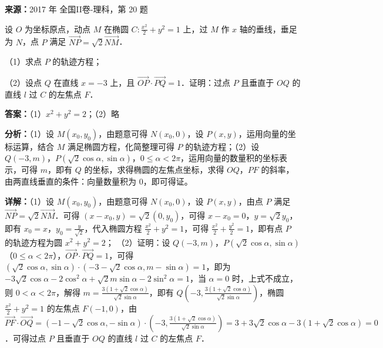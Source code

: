 \begin{question}[points=12]
\textbf{来源：}2017 年 全国II卷-理科，第 20 题\par
设 $O$ 为坐标原点，动点 $M$ 在椭圆 $C:\frac{x^2}{2}+y^2=1$ 上，过 $M$ 作 $x$ 轴的垂线，垂足为 $N$，点 $P$ 满足 $\overrightarrow{NP}=\sqrt{2}\overrightarrow{NM}$．

（1）求点 $P$ 的轨迹方程；

（2）设点 $Q$ 在直线 $x=-3$ 上，且 $\overrightarrow{OP}\cdot\overrightarrow{PQ}=1$．证明：过点 $P$ 且垂直于 $OQ$ 的直线 $l$ 过 $C$ 的左焦点 $F$．
\begin{solution}
\textbf{答案：}（1）$x^2+y^2=2$；（2）略

\textbf{分析：}（1）设 $M(x_0,y_0)$，由题意可得 $N(x_0,0)$，设 $P(x,y)$，运用向量的坐标运算，结合 $M$ 满足椭圆方程，化简整理可得 $P$ 的轨迹方程；（2）设 $Q(-3,m)$，$P(\sqrt{2}\cos\alpha,\sin\alpha)$，$0\le\alpha<2\pi$，运用向量的数量积的坐标表示，可得 $m$，即有 $Q$ 的坐标，求得椭圆的左焦点坐标，求得 $OQ$，$PF$ 的斜率，由两直线垂直的条件：向量数量积为 $0$，即可得证。

\textbf{详解：}（1）设 $M(x_0,y_0)$，由题意可得 $N(x_0,0)$，设 $P(x,y)$，由点 $P$ 满足 $\overrightarrow{NP}=\sqrt{2}\overrightarrow{NM}$．可得 $(x-x_0,y)=\sqrt{2}(0,y_0)$，可得 $x-x_0=0$，$y=\sqrt{2}y_0$，即有 $x_0=x$，$y_0=\frac{y}{\sqrt{2}}$，代入椭圆方程 $\frac{x^2}{2}+y^2=1$，可得 $\frac{x^2}{2}+\frac{y^2}{2}=1$，即有点 $P$ 的轨迹方程为圆 $x^2+y^2=2$；
（2）证明：设 $Q(-3,m)$，$P(\sqrt{2}\cos\alpha,\sin\alpha)$（$0\le\alpha<2\pi$），$\overrightarrow{OP}\cdot\overrightarrow{PQ}=1$，可得 $(\sqrt{2}\cos\alpha,\sin\alpha)\cdot(-3-\sqrt{2}\cos\alpha,m-\sin\alpha)=1$，即为 $-3\sqrt{2}\cos\alpha-2\cos^2\alpha+\sqrt{2}m\sin\alpha-2\sin^2\alpha=1$，当 $\alpha=0$ 时，上式不成立，则 $0<\alpha<2\pi$，解得 $m=\frac{3(1+\sqrt{2}\cos\alpha)}{\sqrt{2}\sin\alpha}$，即有 $Q(-3,\frac{3(1+\sqrt{2}\cos\alpha)}{\sqrt{2}\sin\alpha})$，椭圆 $\frac{x^2}{2}+y^2=1$ 的左焦点 $F(-1,0)$，由 $\overrightarrow{PF}\cdot\overrightarrow{OQ}=(-1-\sqrt{2}\cos\alpha,-\sin\alpha)\cdot(-3,\frac{3(1+\sqrt{2}\cos\alpha)}{\sqrt{2}\sin\alpha})=3+3\sqrt{2}\cos\alpha-3(1+\sqrt{2}\cos\alpha)=0$．可得过点 $P$ 且垂直于 $OQ$ 的直线 $l$ 过 $C$ 的左焦点 $F$．
\end{solution}
\end{question}

